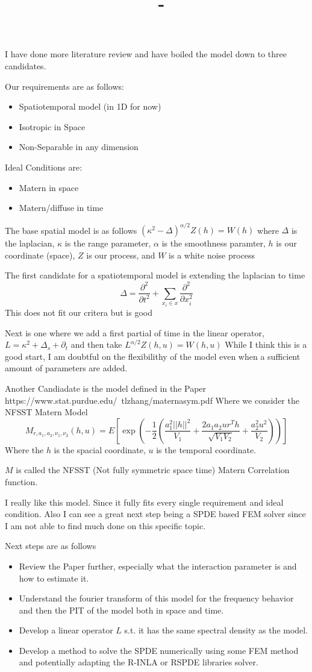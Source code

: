 \documentclass[answers,12pt,addpoints]{exam}
\author{\name}
\title{\course \ - \assignment}
\begin{document}
I have done more literature review and have boiled the model down to three candidates. 

Our requirements are as follows:
\begin{itemize}
    \item Spatiotemporal model (in 1D for now)
    \item Isotropic in Space
    \item Non-Separable in any dimension
\end{itemize}
Ideal Conditions are:
\begin{itemize}
    \item Matern in space
    \item Matern/diffuse in time
\end{itemize}

The base spatial model is as follows $(\kappa^2 - \Delta)^{\alpha/2} Z(h) = W(h)$ where $\Delta$ is the laplacian, $\kappa$ is the range parameter, $\alpha$ is the smoothness paramter, $h$ is our coordinate (space), $Z$ is our process, and $W$ is a white noise process 

The first candidate for a spatiotemporal model is extending the laplacian to time 
$$ \Delta = \frac{\partial^2}{\partial t^2} + \sum_{x_i \in x} \frac{\partial^2}{\partial x_i^2} $$
This does not fit our critera but is good

Next is one where we add a first partial of time in the linear operator, $L = \kappa^2 + \Delta_s + \partial_t$ and then take $L^{\alpha/2}Z(h,u) = W(h,u)$ 
While I think this is a good start, I am doubtful on the flexibilithy of the model even when a sufficient amount of parameters are added. 

Another Candiadate is the model defined in the Paper https://www.stat.purdue.edu/~tlzhang/maternasym.pdf Where we consider the NFSST Matern Model 
$$ M_{r, a_1, a_2, \nu_1, \nu_2}(h, u) = E\left[\exp\left( -\frac{1}{2} \left( \frac{a_1^2 ||h||^2 }{V_1} +  \frac{2 a_1 a_2 u r^T h }{ \sqrt{V_1 V_2}} + \frac{a_2^2 u^2 }{V_2}   \right) \right) \right]$$
Where the $h$ is the spacial coordinate, $u$ is the temporal coordinate.

$M$ is called the NFSST (Not fully symmetric space time) Matern Correlation function. 

I really like this model. Since it fully fits every single requirement and ideal condition. Also I can see a great next step being a SPDE based FEM solver since I am not able to find much done on this specific topic. 

Next steps are as follows 
\begin{itemize}
    \item Review the Paper further, especially what the interaction parameter is and how to estimate it. 
    \item Understand the fourier transform of this model for the frequency behavior and then the PIT of the model both in space and time.
    \item Develop a linear operator $L$ s.t. it has the same spectral density as the model. 
    \item Develop a method to solve the SPDE numerically using some FEM method and potentially adapting the R-INLA or RSPDE libraries solver.
\end{itemize}
\end{document}
